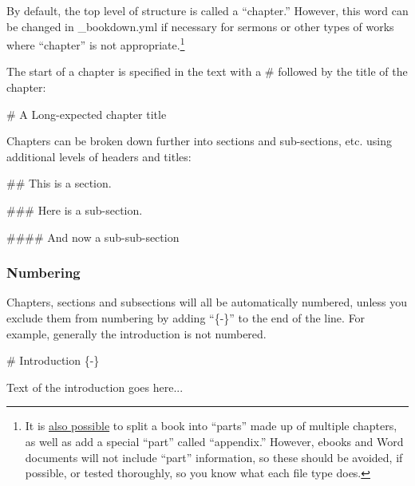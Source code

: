 \documentclass[
]{book}
\newenvironment{Shaded}{\begin{snugshade}}{\end{snugshade}}
\newcommand{\FunctionTok}[1]{\textcolor[rgb]{0.00,0.00,0.00}{#1}}
\newcommand{\NormalTok}[1]{#1}
\begin{document}
By default, the top level of structure is called a ``chapter.'' However, this word can be changed in \_bookdown.yml if necessary for sermons or other types of works where ``chapter'' is not appropriate.\footnote{It is \href{https://bookdown.org/yihui/bookdown/markdown-extensions-by-bookdown.html\#special-headers}{also possible} to split a book into ``parts'' made up of multiple chapters, as well as add a special ``part'' called ``appendix.'' However, ebooks and Word documents will not include ``part'' information, so these should be avoided, if possible, or tested thoroughly, so you know what each file type does.}

The start of a chapter is specified in the text with a \# followed by the title of the chapter:

\begin{Shaded}
\begin{Highlighting}[]
\FunctionTok{\# A Long{-}expected chapter title}
\end{Highlighting}
\end{Shaded}

Chapters can be broken down further into sections and sub-sections, etc. using additional levels of headers and titles:

\begin{Shaded}
\begin{Highlighting}[]
\FunctionTok{\#\# This is a section.}

\FunctionTok{\#\#\# Here is a sub{-}section.}

\FunctionTok{\#\#\#\# And now a sub{-}sub{-}section}
\end{Highlighting}
\end{Shaded}

\hypertarget{numbering}{%
\subsubsection{Numbering}\label{numbering}}

Chapters, sections and subsections will all be automatically numbered, unless you exclude them from numbering by adding ``\{-\}'' to the end of the line. For example, generally the introduction is not numbered.

\begin{Shaded}
\begin{Highlighting}[]
\FunctionTok{\# Introduction \{{-}\}}

\NormalTok{Text of the introduction goes here...}
\end{Highlighting}
\end{Shaded}
\end{document}
